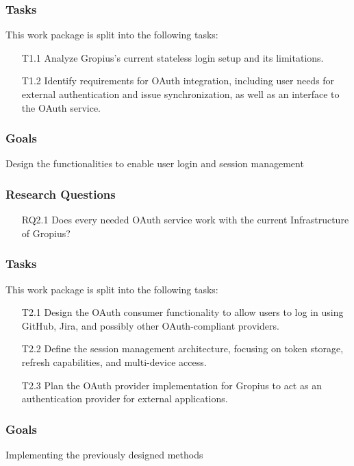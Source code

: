 \subsubsection{Tasks}
This work package is split into the following tasks:
\begin{itemize}
	\item[T1.1] Analyze Gropius's current stateless login setup and its limitations.
	\item[T1.2] Identify requirements for OAuth integration, including user needs for external authentication and issue synchronization, as well as an interface to the OAuth service.
\end{itemize}


\subsubsection{Goals}
Design the functionalities to enable user login and session management
\subsubsection{Research Questions}
\begin{itemize}
	\item[RQ2.1] Does every needed OAuth service work with the current Infrastructure of Gropius?
\end{itemize}

\subsubsection{Tasks}
This work package is split into the following tasks:
\begin{itemize}
	\item[T2.1] Design the OAuth consumer functionality to allow users to log in using GitHub, Jira, and possibly other OAuth-compliant providers.
	\item[T2.2] Define the session management architecture, focusing on token storage, refresh capabilities, and multi-device access.
	\item[T2.3] Plan the OAuth provider implementation for Gropius to act as an authentication provider for external applications.
\end{itemize}


\subsubsection{Goals}
Implementing the previously designed methods

